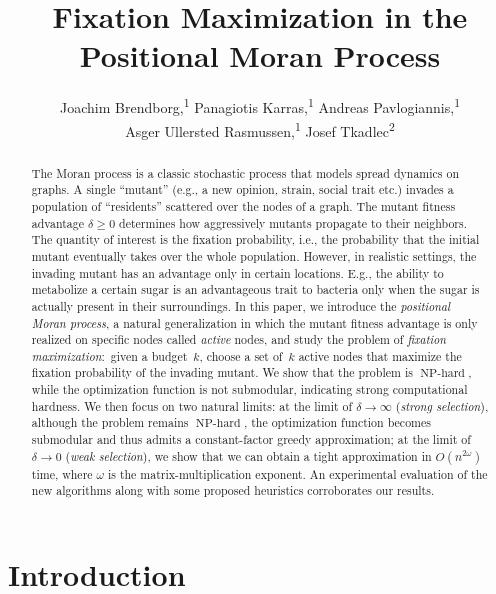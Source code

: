 \documentclass[letterpaper]{article}
\title{Fixation Maximization in the Positional Moran Process}
\author{
Joachim Brendborg,\textsuperscript{\rm 1}
Panagiotis Karras,\textsuperscript{\rm 1}
Andreas Pavlogiannis,\textsuperscript{\rm 1}\\
Asger Ullersted Rasmussen,\textsuperscript{\rm 1}
Josef Tkadlec\textsuperscript{\rm 2}
}
\def\mypath{}
\newcommand{\FitAdv}{\delta}
\newcommand{\NPH}{\operatorname{NP-hard}}
\begin{document}
\maketitle

%
\begin{abstract}
The Moran process is a classic stochastic process that models spread dynamics on graphs.
A single ``mutant'' (e.g., a new opinion, strain, social trait etc.) invades a population of ``residents'' scattered over the nodes of a graph.
The mutant fitness advantage $\FitAdv\geq 0$ determines how aggressively mutants propagate to their neighbors.
The quantity of interest is the fixation probability, i.e., the probability that the initial mutant eventually takes over the whole population.
However, in realistic settings, the invading mutant has an advantage only in certain locations.
E.g., the ability to metabolize a certain sugar is an advantageous trait to bacteria only when the sugar is actually present in their surroundings.
In this paper, we introduce the \emph{positional Moran process}, a natural generalization in which the mutant fitness advantage is only realized on specific nodes called \emph{active} nodes, and study the problem of \emph{fixation maximization}:~given a budget~$k$, choose a set of~$k$ active nodes that maximize the fixation probability of the invading mutant.
We show that the problem is $\NPH$, while the optimization function is not submodular, indicating strong computational hardness.
We then focus on two natural limits:
at the limit of $\FitAdv\to\infty$ (\emph{strong selection}), although the problem remains $\NPH$, the optimization function becomes submodular and thus admits a constant-factor greedy approximation; at the limit of~$\FitAdv\to 0$ (\emph{weak selection}), we show that we can obtain a tight approximation in
$O(n^{2\omega})$ time, where
$\omega$ is the matrix-multiplication exponent. An experimental evaluation of the new algorithms along with some proposed heuristics corroborates our results.
\end{abstract}


%
\section{Introduction}
\end{document}
